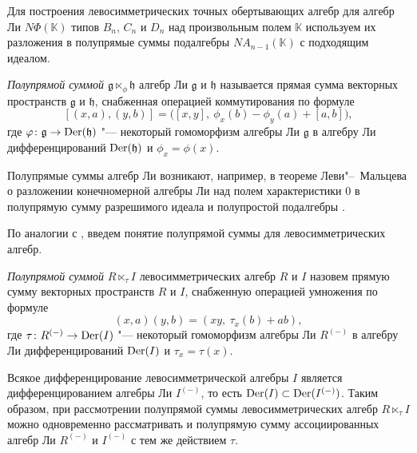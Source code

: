 \documentclass[a4paper,14pt,oneside,openany]{memoir}
\begin{document}
\medskip

Для построения левосимметрических точных обертывающих алгебр для алгебр Ли
$N\Phi(\mathbb{K})$ типов $B_n$, $C_n$ и $D_n$ над произвольным полем
$\mathbb{K}$ используем их разложения в полупрямые суммы подалгебры
$NA_{n-1}(\mathbb{K})$ с подходящим идеалом.

\begin{definition}\label{def:semidirect-lie}
    \emph{Полупрямой суммой $\mathfrak{g}\ltimes_{\phi} \mathfrak{h}$} алгебр
    Ли $\mathfrak{g}$ и $\mathfrak{h}$ называется прямая сумма векторных
    пространств $\mathfrak{g}$ и $\mathfrak{h}$, снабженная операцией
    коммутирования по формуле
    \[
        [(x,a),(y,b)] = \bigl([x,y],\ \phi_x(b)-\phi_y(a) + [a,b]\bigr),
    \]
    где $\varphi\colon\mathfrak{g}\to\operatorname{Der}(\mathfrak{h})$ "--- некоторый гомоморфизм
    алгебры Ли $\mathfrak{g}$ в алгебру Ли дифференцирований $\operatorname{Der}(\mathfrak{h})$ и
    $\phi_x = \phi(x)$.
\end{definition}
%
Полупрямые суммы алгебр Ли возникают, например, в теореме Леви"--~Мальцева о
разложении конечномерной алгебры Ли над полем характеристики 0 в полупрямую
сумму разрешимого идеала и полупростой подалгебры
\cite[\S~6.1]{vinberg-onishik}.

По аналогии с , введем понятие полупрямой суммы
для левосимметрических алгебр.
\begin{definition}\label{def:semidirect-pre-lie}
    \emph{Полупрямой суммой}
    $R\ltimes_{\tau} I$ левосимметрических алгебр $R$ и $I$ назовем прямую сумму
    векторных пространств $R$ и $I$, снабженную операцией умножения по формуле
    \[
        (x,a)(y,b) = (xy,\ \tau_x(b) + ab),
    \]
    где $\tau\colon R^{(-)} \to \operatorname{Der}(I)$ "--- некоторый гомоморфизм алгебры Ли
    $R^{(-)}$ в алгебру Ли дифференцирований $\operatorname{Der}(I)$ и $\tau_x = \tau(x)$.
\end{definition}
%
Всякое дифференцирование левосимметрической алгебры $I$ является
дифференцированием алгебры Ли $I^{(-)}$, то есть $\operatorname{Der}(I)\subset
\operatorname{Der}(I^{(-)})$. Таким образом, при рассмотрении полупрямой суммы
левосимметрических алгебр $R\ltimes_{\tau} I$ можно одновременно рассматривать
и полупрямую сумму ассоциированных алгебр Ли $R^{(-)}$ и $I^{(-)}$ с тем же
действием $\tau$.

\medskip
\end{document}
